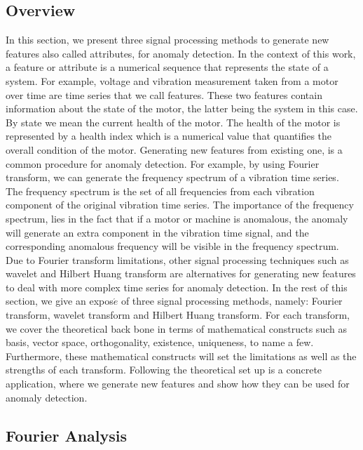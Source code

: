 \documentclass[11pt, oneside]{article}   	%
\begin{document}
\subsection{Overview}
 In this section, we present three signal processing methods to generate new features also called attributes, for anomaly detection. In the context of this work, a feature or attribute is a numerical sequence that represents the state of a system. For example, voltage and vibration measurement taken from a motor over time are time series that we call features. These two features contain information about the state of the motor, the latter being the system in this case. 
 By state we mean the current health of the motor. The health of the motor is represented by a health index which is a numerical value that quantifies the overall condition of the motor.
 \justify
 Generating new features from existing one, is a common procedure for anomaly detection. For example, by using Fourier transform, we can generate the frequency spectrum of a vibration time series. The frequency spectrum is the set of all frequencies from each vibration component of the original vibration time series. The importance of the frequency spectrum, lies in the fact that if a motor or machine is anomalous, the anomaly will generate an extra component in the vibration time signal, and the corresponding anomalous frequency will be visible in the frequency spectrum. Due to Fourier transform limitations, other signal processing techniques such as
  wavelet and Hilbert Huang transform are alternatives for generating new features to deal with more complex time series for anomaly detection.
 \justify
 In the rest of this section, we give an expos$\acute{e}$  of three signal processing methods, namely: Fourier transform, wavelet transform and Hilbert Huang transform. For each transform, we cover the theoretical back bone in terms of mathematical constructs such as basis, vector space, orthogonality, existence, uniqueness, to name a few. Furthermore, these mathematical constructs will set the limitations as well as the strengths of each transform. Following the theoretical set up is a concrete application, where we generate new features and show how they can be used for anomaly detection.
 


\subsection{Fourier Analysis}
\end{document}
